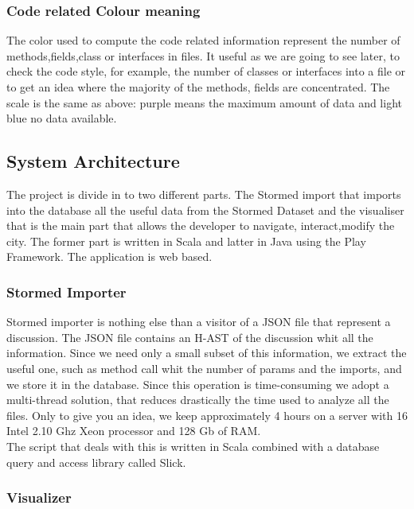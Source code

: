 \documentclass[]{usiinfbachelorproject}
\begin{document}
\subsubsection{Code related Colour meaning}

The color used to compute the code related information represent  the number of methods,fields,class or interfaces in files. It useful as we are going to see later, to check the code style, for example, the number of classes or interfaces into a file or to get an idea where the majority of the methods, fields are concentrated. The scale is the same as above: purple means the maximum amount of  data and light blue no data available. 


\newpage
\subsection{System Architecture }
The project is divide in to two different parts. The Stormed import that imports into the database all the useful data from the Stormed Dataset and the visualiser that is the main part  that allows the developer to navigate, interact,modify the city. The former part is written in Scala and latter in Java using the Play Framework. The application is web based. 




\subsubsection{Stormed Importer}
Stormed importer is nothing else than a visitor of a JSON file that represent a discussion. The JSON file contains an H-AST of the discussion whit all the information. Since we need only a small subset of this information, we extract the useful one, such as method call whit the number of params and the imports, and we store it in the database. Since this operation is time-consuming we adopt a multi-thread solution, that reduces drastically the time used to analyze all the files. Only to give you an idea, we keep approximately 4 hours on a server with 16 Intel 2.10 Ghz Xeon processor and 128 Gb of RAM.\\
The script that deals with this is written in Scala combined with a database query and access library called Slick.


\subsubsection{Visualizer}
\end{document}
